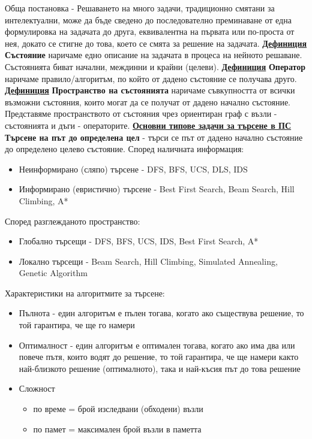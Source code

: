 \documentclass{article}
\begin{document}
Обща постановка - Решаването на много задачи, традиционно смятани за интелектуални, може да бъде сведено до
последователно преминаване от една формулировка на задачата до друга, еквивалентна на първата или по-проста от
нея, докато се стигне до това, което се смята за решение на задачата. \newline\newline
\textbf{\underline{Дефиниция}}
\textbf{Състояние} наричаме едно описание на задачата в процеса на нейното решаване. Състоянията биват начални,
междинни и крайни (целеви). \newline\newline
\textbf{\underline{Дефиниция}}
\textbf{Оператор} наричаме правило/алгоритъм, по който от дадено състояние се получава друго. \newline\newline
\textbf{\underline{Дефиниция}}
\textbf{Пространство на състоянията} наричаме съвкупността от всички възможни състояния, които могат да се
получат от дадено начално състояние. Представяме пространството от състояния чрез ориентиран граф с възли - състоянията и дъги
- операторите. \newline\newline
\textbf{\underline{Основни типове задачи за търсене в ПС}} \newline\newline
\textbf{Търсене на път до определена цел} - търси се път от дадено начално състояние до определено целево състояние. \newline\newline
Според наличната информация:
\begin{itemize}
    \item Неинформирано (сляпо) търсене - DFS, BFS, UCS, DLS, IDS
    \item Информирано (евристично) търсене - Best First Search, Beam Search, Hill Climbing, A* 
\end{itemize}
Според разглежданото пространство:
\begin{itemize}
    \item Глобално търсещи - DFS, BFS, UCS, IDS, Best First Search, A*
    \item Локално търсещи - Beam Search, Hill Climbing, Simulated Annealing, Genetic Algorithm
\end{itemize}
Характеристики на алгоритмите за търсене:
\begin{itemize}
    \item Пълнота - един алгоритъм е пълен тогава, когато ако съществува решение, то той гарантира, че ще го намери
    \item Оптималност - един алгоритъм е оптимален тогава, когато ако има два или повече пътя, които водят до
    решение, то той гарантира, че ще намери както най-близкото решение (оптималното), така и най-късия път до това
    решение
    \item Сложност
    \begin{itemize}
		\item по време = брой изследвани (обходени) възли
		\item по памет = максимален брой възли в паметта
	\end{itemize}
\end{itemize}
\end{document}
